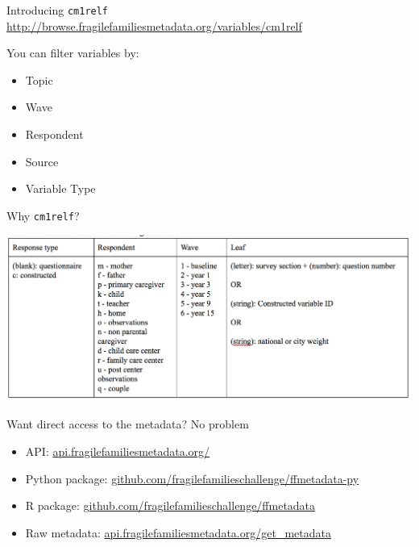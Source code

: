 \documentclass{beamer}
\begin{document}
\begin{frame}

Introducing \texttt{cm1relf}\\

\url{http://browse.fragilefamiliesmetadata.org/variables/cm1relf}

\end{frame}
\begin{frame}

You can filter variables by:
\begin{itemize}
\item Topic
\item Wave
\item Respondent
\item Source
\item Variable Type
\end{itemize}

\end{frame}	
\begin{frame}

Why \texttt{cm1relf}? \pause

\begin{center}
\includegraphics[width=\textwidth]{figures/ff_variablename_standards}
\end{center}

\end{frame}
\begin{frame}

Want direct access to the metadata?  \pause No problem

\begin{itemize}
\item API: \url{api.fragilefamiliesmetadata.org/}
\item Python package: \url{github.com/fragilefamilieschallenge/ffmetadata-py}
\item R package: \url{github.com/fragilefamilieschallenge/ffmetadata}
\item Raw metadata: \url{api.fragilefamiliesmetadata.org/get_metadata}
\end{itemize}

\end{frame}
\end{document}
